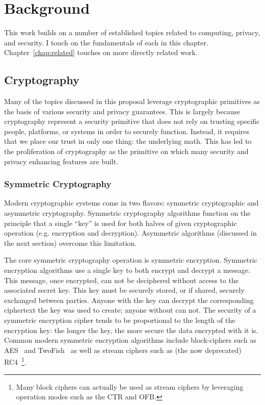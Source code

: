 \chapter{Background}
\label{chap:background}

This work builds on a number of established topics related to
computing, privacy, and security. I touch on the fundamentals of each
in this chapter. Chapter~\ref{chap:related} touches on more directly
related work.

\section{Cryptography}
\label{chap:background:crypto}

Many of the topics discussed in this proposal leverage cryptographic
primitives as the basis of various security and privacy
guarantees. This is largely because cryptography represent a security
primitive that does not rely on trusting specific people, platforms,
or systems in order to securely function. Instead, it requires that we
place our trust in only one thing: the underlying math. This has led
to the proliferation of cryptography as the primitive on which many
security and privacy enhancing features are built.

\subsection{Symmetric Cryptography}

Modern cryptographic systems come in two flavors: symmetric
cryptographic and asymmetric cryptography. Symmetric cryptography
algorithms function on the principle that a single ``key'' is used for
both halves of given cryptographic operation (e.g. encryption and
decryption). Asymmetric algorithms (discussed in the next section)
overcome this limitation.

The core symmetric cryptography operation is symmetric
encryption. Symmetric encryption algorithms use a single key to both
encrypt and decrypt a message. This message, once encrypted, can not
be deciphered without access to the associated secret key. This key
must be securely stored, or if shared, securely exchanged between
parties. Anyone with the key can decrypt the corresponding ciphertext
the key was used to create; anyone without can not. The security of a
symmetric encryption cipher tends to be proportional to the length of
the encryption key: the longer the key, the more secure the data
encrypted with it is. Common modern symmetric encryption algorithms
include block-ciphers such as AES~\cite{nist2001} and
TwoFish~\cite{schneier1998} as well as stream ciphers such as (the now
deprecated) RC4~\cite{rc4-source}\footnote{Many block ciphers can
  actually be used as stream ciphers by leveraging operation modes
  such as the CTR and OFB.}.

